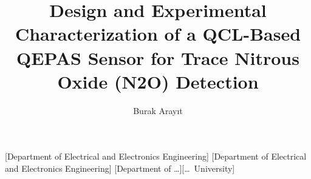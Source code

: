 
\title{Design and Experimental Characterization of a QCL-Based QEPAS Sensor for Trace Nitrous Oxide (N2O) Detection}

\author{Burak Aray{\i}t}




[Department of Electrical and Electronics Engineering]
[Department of Electrical and Electronics Engineering]
[Department of \ldots][\ldots\ University]


